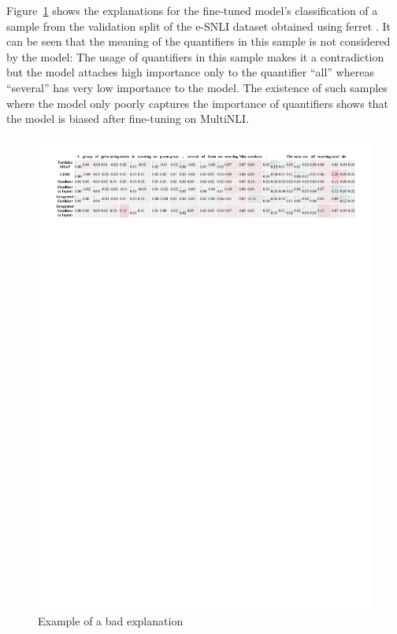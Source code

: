 Figure~\ref{fig:ferret-sample} shows the explanations for the fine-tuned model's classification of a sample from the validation split of the \ac{e-SNLI} dataset obtained using ferret \cite{ferret}. It can be seen that the meaning of the quantifiers in this sample is not considered by the model: The usage of quantifiers in this sample makes it a contradiction but the model attaches high importance only to the quantifier \enquote{all} whereas \enquote{several} has very low importance to the model. The existence of such samples where the model only poorly captures the importance of quantifiers shows that the model is biased after fine-tuning on \ac{MultiNLI}.

\begin{figure}[t!]
    \centering
    \includegraphics[width=\textwidth]{./images/ferret_sample.pdf}
    \caption{Example of a bad explanation}
    \label{fig:ferret-sample}
\end{figure}

